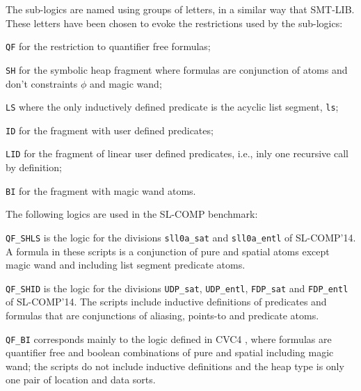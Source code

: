 \documentclass[10pt]{llncs}
\begin{document}
The sub-logics are named using groups of letters, in a similar way 
that SMT-LIB. These letters have been chosen to evoke the restrictions 
used by the sub-logics:
\begin{compactitem}
\item {\tt QF} for the restriction to quantifier free formulas;
\item {\tt SH} for the symbolic heap fragment where formulas are conjunction of atoms and don't constraints $\phi$ and magic wand;
\item {\tt LS} where the only inductively defined predicate is the acyclic list segment, {\tt ls};
\item {\tt ID} for the fragment with user defined predicates;
\item {\tt LID} for the fragment of linear user defined predicates, i.e., inly one recursive call by definition;
\item {\tt BI} for the fragment with magic wand atoms.
\end{compactitem} 

\medskip
The following logics are used in the SL-COMP benchmark:
\begin{compactitem}
\item {\tt QF\_SHLS} is the logic for the divisions 
{\tt sll0a\_sat} and {\tt sll0a\_entl} of SL-COMP'14. A formula in these scripts is 
a conjunction of pure and spatial atoms except magic wand  and including
list segment predicate atoms.


\item {\tt QF\_SHID} is the logic for the divisions
{\tt UDP\_sat}, {\tt UDP\_entl}, {\tt FDP\_sat} and {\tt FDP\_entl} of SL-COMP'14. 
The scripts include inductive definitions of predicates and
formulas that are conjunctions of aliasing, points-to and predicate atoms.


\item {\tt QF\_BI} corresponds mainly to the logic defined in 
CVC4 \cite{cvc4-seplog}, where formulas are quantifier free and
boolean combinations of pure and spatial including magic wand;
the scripts do not include inductive definitions and the heap
type is only one pair of location and data sorts.

\end{compactitem} 
\end{document}
